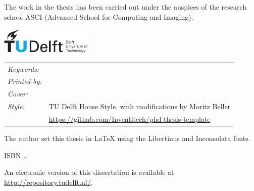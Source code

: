 \begin{titlepage}


\medskip
\medskip
\noindent The work in the thesis has been carried out under the auspices of the research school ASCI
(Advanced School for Computing and Imaging).

\medskip
\vfill
\begin{center}
    \includegraphics[height=0.5in]{title/logos/tudelft}
    \hspace{2em}
    \\ \vspace{0.5cm}
\end{center}
\vfill

\noindent
\begin{tabular}{@{}p{}@{}p{}}
  \textit{Keywords:} &  \\[\medskipamount]
      \textit{Printed by:} &  \\[\medskipamount]
      \textit{Cover:} &  \\[\medskipamount]
      \textit{Style:} & TU Delft House Style, with modifications by Moritz Beller \\& \url{https://github.com/Inventitech/phd-thesis-template} \\[\medskipamount]
\end{tabular}

\medskip
\medskip
\noindent The author set this thesis in \LaTeX\xspace using the Libertinus and Inconsolata fonts.

\vspace{\bigskipamount}



\noindent ISBN \ldots

\medskip
\noindent An electronic version of this dissertation is available at \\
\url{http://repository.tudelft.nl/}.

\end{titlepage}

